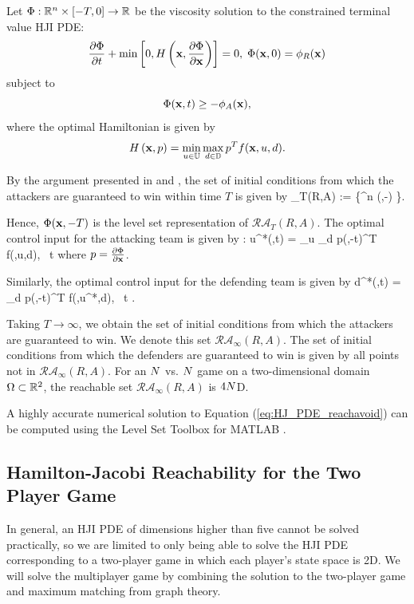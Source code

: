 Let $\Phi:\mathbb{R}^n\times[-T,0]\rightarrow\mathbb{R}$ be the viscosity solution \cite{j:Crandall-TAMS-1983} to the constrained terminal value HJI PDE:
\begin{equation}
	\label{eq:HJ_PDE_reachavoid}
	\frac{\partial \Phi}{\partial t} + \min \left[0, H\left(\mathbf{x},\frac{\partial \Phi}{\partial \mathbf{x}}\right)\right] = 0,\;\Phi(\mathbf{x},0) = \phi_R(\mathbf{x})	 
\end{equation}
subject to 
$$\Phi(\mathbf{x},t) \geq -\phi_A(\mathbf{x}),$$
where the optimal Hamiltonian is given by
$$H\left(\mathbf{x},p\right) = \min_{u \in \mathbb{U}} \max_{d \in \mathbb{D}} p^T f(\mathbf{x},u,d).$$

By the argument presented in \cite{j:mitchell-TAC-2005} and \cite{mitchell-thesis}, the set of initial conditions from which the attackers are guaranteed to win within time $T$ is given by 
\bq
{}_T(R,A) := \left\{\xj\in \R^n \mid \Phi (\xj,-\T) \right\}.
\eq

Hence, $\Phi (\mathbf{x},-T)$ is the level set representation of $\mathcal{RA}_T(R,A)$. The optimal control input for the attacking team is given by \cite{j:Lygeros-automatica-1999, j:Tomlin-ProcIEEE-2000, Huang2011}:
\bq \label{eq:opt_ctrl_u}
  u^*(\xj,t) = \arg \min_{u \in {}} \max_{d \in {}} p(\xj,-t)^T f(\xj,u,d), \!\ t \in [0,T] 
\eq
where $p = \frac{\partial \Phi}{\partial \mathbf{x}}$. 

Similarly, the optimal control input for the defending team is given by
\bq \label{eq:opt_ctrl_d}
  d^*(\xj,t) = \arg \max_{d \in {}} p(\xj,-t)^T f(\xj,u^*,d), \ t \in [0,T].
\eq

Taking $T\rightarrow\infty$, we obtain the set of initial conditions from which the attackers are guaranteed to win. We denote this set $\mathcal{RA}_\infty(R,A)$. The set of initial conditions from which the defenders are guaranteed to win is given by all points not in $\mathcal{RA}_\infty(R,A)$. For an $N$ vs. $N$ game on a two-dimensional domain $\Omega\subset\mathbb{R}^2$, the reachable set $\mathcal{RA}_\infty(R,A)$ is $4N$D.

A highly accurate numerical solution to Equation (\ref{eq:HJ_PDE_reachavoid}) can be computed using the Level Set Toolbox for MATLAB \cite{LSToolbox}.

\subsection{Hamilton-Jacobi Reachability for the Two Player Game}
\label{subsec:hj_two}
In general, an HJI PDE of dimensions higher than five cannot be solved practically, so we are limited to only being able to solve the HJI PDE corresponding to a two-player game in which each player's state space is 2D. We will solve the multiplayer game by combining the solution to the two-player game and maximum matching from graph theory. 

